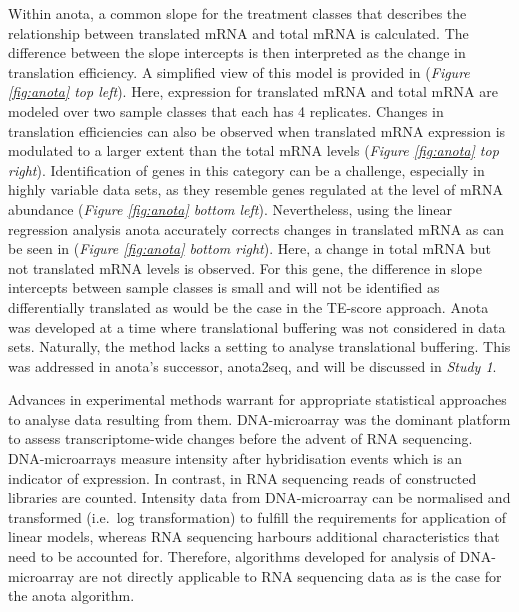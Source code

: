 \documentclass[12pt,openany]{book}
\begin{document}
Within anota, a common slope for the treatment classes that describes
the relationship between translated mRNA and total mRNA is calculated.
The difference between the slope intercepts is then interpreted as the
change in translation efficiency. A simplified view of this model is
provided in (\emph{Figure \ref{fig:anota} top left}). Here, expression
for translated mRNA and total mRNA are modeled over two sample classes
that each has 4 replicates. Changes in translation efficiencies can also
be observed when translated mRNA expression is modulated to a larger
extent than the total mRNA levels (\emph{Figure \ref{fig:anota} top
right}). Identification of genes in this category can be a challenge,
especially in highly variable data sets, as they resemble genes
regulated at the level of mRNA abundance (\emph{Figure \ref{fig:anota}
bottom left}). Nevertheless, using the linear regression analysis anota
accurately corrects changes in translated mRNA as can be seen in
(\emph{Figure \ref{fig:anota} bottom right}). Here, a change in total
mRNA but not translated mRNA levels is observed. For this gene, the
difference in slope intercepts between sample classes is small and will
not be identified as differentially translated as would be the case in
the TE-score approach. Anota was developed at a time where translational
buffering was not considered in data sets. Naturally, the method lacks a
setting to analyse translational buffering. This was addressed in
anota's successor, anota2seq, and will be discussed in \emph{Study 1}.

Advances in experimental methods warrant for appropriate statistical
approaches to analyse data resulting from them. DNA-microarray was the
dominant platform to assess transcriptome-wide changes before the advent
of RNA sequencing. DNA-microarrays measure intensity after hybridisation
events which is an indicator of expression. In contrast, in RNA
sequencing reads of constructed libraries are counted. Intensity data
from DNA-microarray can be normalised and transformed (i.e.~log
transformation) to fulfill the requirements for application of linear
models, whereas RNA sequencing harbours additional characteristics that
need to be accounted for. Therefore, algorithms developed for analysis
of DNA- microarray are not directly applicable to RNA sequencing data as
is the case for the anota algorithm.
\end{document}
